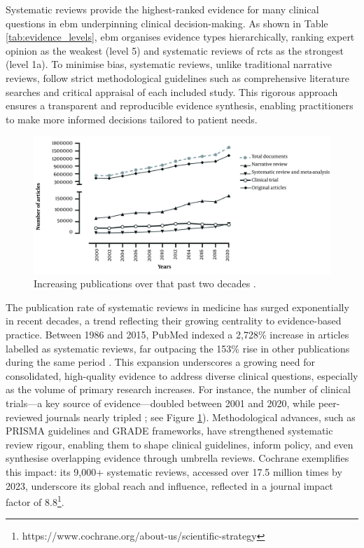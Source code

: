 \documentclass{article}
\begin{document}
Systematic reviews provide the highest-ranked evidence for many clinical questions in \gls*{ebm} underpinning clinical decision-making. As shown in Table \ref{tab:evidence_levels}, \gls*{ebm} organises evidence types hierarchically, ranking expert opinion as the weakest (level 5) and systematic reviews of \gls*{rcts} as the strongest (level 1a). To minimise bias, systematic reviews, unlike traditional narrative reviews, follow strict methodological guidelines such as comprehensive literature searches and critical appraisal of each included study. This rigorous approach ensures a transparent and reproducible evidence synthesis, enabling practitioners to make more informed decisions tailored to patient needs.



\begin{figure}
    \centering
    \includegraphics[width=1\linewidth]{images/increase_in_publications.jpg}
    \caption{Increasing publications over that past two decades \cite{ghasemi_scientific_2022}.}
    \label{fig:increasing_publications_over_time}
\end{figure}

The publication rate of systematic reviews in medicine has surged exponentially in recent decades, a trend reflecting their growing centrality to evidence-based practice. Between 1986 and 2015, PubMed indexed a 2,728\% increase in articles labelled as systematic reviews, far outpacing the 153\% rise in other publications during the same period \cite{ioannidis_mass_2016}. This expansion underscores a growing need for consolidated, high-quality evidence to address diverse clinical questions, especially as the volume of primary research increases. For instance, the number of clinical trials—a key source of evidence—doubled between 2001 and 2020, while peer-reviewed journals nearly tripled \cite{ghasemi_scientific_2022}; see Figure \ref{fig:increasing_publications_over_time}). Methodological advances, such as PRISMA guidelines and GRADE frameworks, have strengthened systematic review rigour, enabling them to shape clinical guidelines, inform policy, and even synthesise overlapping evidence through umbrella reviews. Cochrane exemplifies this impact: its 9,000+ systematic reviews, accessed over 17.5 million times by 2023, underscore its global reach and influence, reflected in a journal impact factor of 8.8\footnote{https://www.cochrane.org/about-us/scientific-strategy}.
\end{document}
